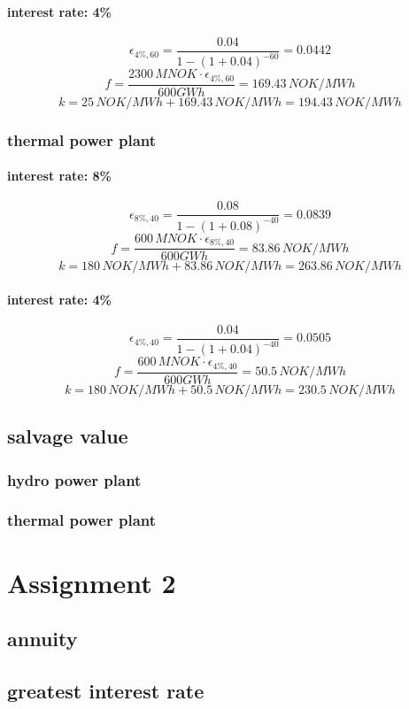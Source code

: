 \documentclass{article}
\begin{document}
\paragraph{interest rate: 4\%\\}
$$\epsilon_{4\%,60}=\frac{0.04}{1-(1+0.04)^{-60}}=0.0442$$
$$f=\frac{2300\,MNOK\cdot\epsilon_{4\%,60}}{600GWh}=169.43\,NOK/MWh$$
$$k=25\,NOK/MWh+169.43\,NOK/MWh=194.43\,NOK/MWh$$
\subsubsection{thermal power plant}
\paragraph{interest rate: 8\%\\}
$$\epsilon_{8\%,40}=\frac{0.08}{1-(1+0.08)^{-40}}=0.0839$$
$$f=\frac{600\,MNOK\cdot\epsilon_{8\%,40}}{600GWh}=83.86\,NOK/MWh$$
$$k=180\,NOK/MWh+83.86\,NOK/MWh=263.86\,NOK/MWh$$
\paragraph{interest rate: 4\%\\}
$$\epsilon_{4\%,40}=\frac{0.04}{1-(1+0.04)^{-40}}=0.0505$$
$$f=\frac{600\,MNOK\cdot\epsilon_{4\%,40}}{600GWh}=50.5\,NOK/MWh$$
$$k=180\,NOK/MWh+50.5\,NOK/MWh=230.5\,NOK/MWh$$
\subsection{salvage value}
\subsubsection{hydro power plant}
\subsubsection{thermal power plant}
\section{Assignment 2}
\subsection{annuity}
\subsection{greatest interest rate}
\end{document}
